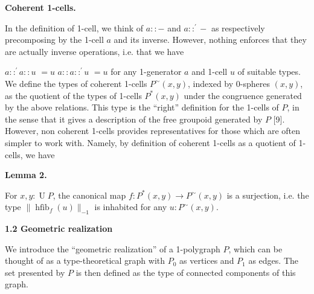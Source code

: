 \documentclass[10pt,a4paper]{amsart}
\begin{document}
 
\par\medskip\noindent\textbf{Coherent 1-cells.}\par
 
 
In the definition of 1-cell, we think of $a::-$ and $a::^{\prime}-$ as respectively precomposing by the 1-cell $a$ and its inverse. However, nothing enforces that they are actually inverse operations, i.e. that we have\par
    $\displaystyle a::^{\prime}a::u$ $\displaystyle=u$ $\displaystyle a::a::^{\prime}u$ $\displaystyle=u$    
for any 1-generator $a$ and 1-cell $u$ of suitable types. We define the types of coherent 1-cells $P^{\sim}(x,y)$, indexed by 0-spheres $(x,y)$, as the quotient of the types of 1-cells $P^{*}(x,y)$ under the congruence generated by the above relations. This type is the “right” definition for the 1-cells of $P$, in the sense that it gives a description of the free groupoid generated by $P$ [9]. However, non coherent 1-cells provides representatives for those which are often simpler to work with. Namely, by definition of coherent 1-cells as a quotient of 1-cells, we have\par
 
 
 
\par\medskip\noindent\textbf{Lemma 2.}\par
 
 
For $x,y:\operatorname{U}P$, the canonical map $f:P^{*}(x,y)\to P^{\sim}(x,y)$ is a surjection, i.e. the type $\|\operatorname{hfib}_{f}(u)\|_{-1}$ is inhabited for any $u:P^{\sim}(x,y)$.\par
 
 
 
 
 
 
\par\medskip\noindent\textbf{1.2 Geometric realization}\par
 
 
We introduce the “geometric realization” of a 1-polygraph $P$, which can be thought of as a type-theoretical graph with $P_{0}$ as vertices and $P_{1}$ as edges. The set presented by $P$ is then defined as the type of connected components of this graph.\par
 
\end{document}
